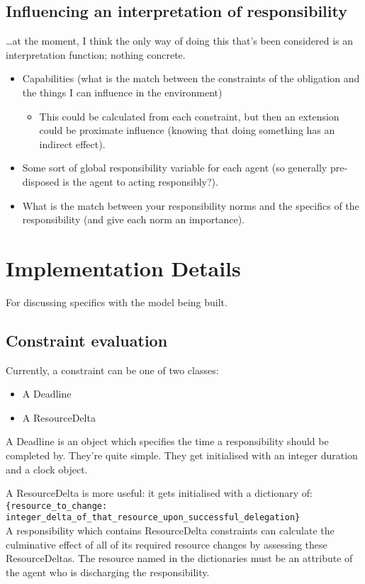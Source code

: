 \documentclass{article}
\begin{document}
\subsection{Influencing an interpretation of responsibility}

\ldots{}at the moment, I think the only way of doing this that's been considered is an interpretation function; nothing concrete.\par

\begin{itemize}
\item Capabilities (what is the match between the constraints of the obligation and the things I can influence in
  the environment)
  \begin{itemize}
  \item This could be calculated from each constraint, but then an extension could be proximate influence (knowing that
    doing something has an indirect effect).
  \end{itemize}
\item Some sort of global responsibility variable for each agent (so generally pre-disposed is the agent to acting responsibly?).

\item What is the match between your responsibility norms and the specifics of the responsibility (and give each norm an importance).

\end{itemize}

\section{Implementation Details}
For discussing specifics with the model being built.

\subsection{Constraint evaluation}
Currently, a constraint can be one of two classes:

\begin{itemize}
    \item A Deadline
    \item A ResourceDelta
\end{itemize}

A Deadline is an object which specifies the time a responsibility should be completed by. They're quite simple. They get initialised with an integer duration and a clock object.\par

A ResourceDelta is more useful: it gets initialised with a dictionary of:\\
\texttt{\{resource\_to\_change: integer\_delta\_of\_that\_resource\_upon\_successful\_delegation\}}\\
A responsibility which contains ResourceDelta constraints can calculate the culminative effect of all of its required resource changes by assessing these ResourceDeltas. The resource named in the dictionaries must be an attribute of the agent who is discharging the responsibility.
\end{document}
